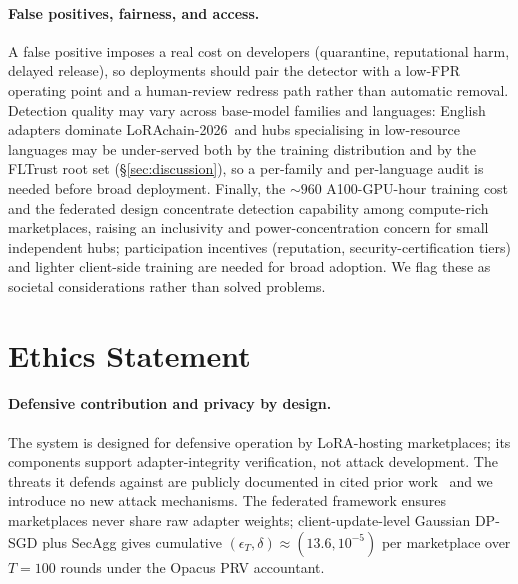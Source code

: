 \documentclass[11pt]{article}
\theoremstyle{plain}
\theoremstyle{definition}
\theoremstyle{remark}
\newcommand{\benchname}{LoRAchain-2026}
\begin{document}
\paragraph{False positives, fairness, and access.}
A false positive imposes a real cost on developers (quarantine,
reputational harm, delayed release), so deployments should pair
the detector with a low-FPR operating point and a human-review
redress path rather than automatic removal. Detection quality
may vary across base-model families and languages: English
adapters dominate \benchname\ and hubs specialising in
low-resource languages may be under-served both by the training
distribution and by the FLTrust root set (§\ref{sec:discussion}),
so a per-family and per-language audit is needed before broad
deployment. Finally, the ${\sim}960$ A100-GPU-hour training cost
and the federated design concentrate detection capability among
compute-rich marketplaces, raising an inclusivity and
power-concentration concern for small independent hubs;
participation incentives (reputation, security-certification
tiers) and lighter client-side training are needed for broad
adoption. We flag these as societal considerations rather than
solved problems.

\section*{Ethics Statement}

\paragraph{Defensive contribution and privacy by design.}
The system is designed for defensive operation by LoRA-hosting
marketplaces; its components support adapter-integrity
verification, not attack development. The threats it defends
against are publicly documented in cited prior
work~\cite{liu2024loraattack,lermen2023lora,huang2024composite}
and we introduce no new attack mechanisms. The federated framework
ensures marketplaces never share raw adapter weights;
client-update-level Gaussian DP-SGD plus SecAgg gives cumulative
$(\epsilon_T,\delta)\!\approx\!(13.6,10^{-5})$ per marketplace
over $T\!=\!100$ rounds under the Opacus PRV accountant.
\end{document}
